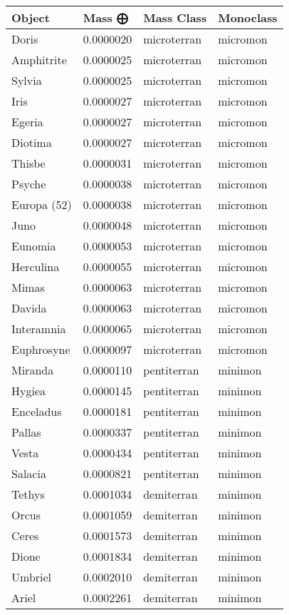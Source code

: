\documentclass[
  letterpaper,
]{book}
\begin{document}
\begin{longtable}[]{@{}llll@{}}
\toprule\noalign{}
Object & Mass ⨁ & Mass Class & Monoclass \\
\midrule\noalign{}
\endhead
\bottomrule\noalign{}
\endlastfoot
Doris & 0.0000020 & microterran & micromon \\
Amphitrite & 0.0000025 & microterran & micromon \\
Sylvia & 0.0000025 & microterran & micromon \\
Iris & 0.0000027 & microterran & micromon \\
Egeria & 0.0000027 & microterran & micromon \\
Diotima & 0.0000027 & microterran & micromon \\
Thisbe & 0.0000031 & microterran & micromon \\
Psyche & 0.0000038 & microterran & micromon \\
Europa (52) & 0.0000038 & microterran & micromon \\
Juno & 0.0000048 & microterran & micromon \\
Eunomia & 0.0000053 & microterran & micromon \\
Herculina & 0.0000055 & microterran & micromon \\
Mimas & 0.0000063 & microterran & micromon \\
Davida & 0.0000063 & microterran & micromon \\
Interamnia & 0.0000065 & microterran & micromon \\
Euphrosyne & 0.0000097 & microterran & micromon \\
Miranda & 0.0000110 & pentiterran & minimon \\
Hygiea & 0.0000145 & pentiterran & minimon \\
Enceladus & 0.0000181 & pentiterran & minimon \\
Pallas & 0.0000337 & pentiterran & minimon \\
Vesta & 0.0000434 & pentiterran & minimon \\
Salacia & 0.0000821 & pentiterran & minimon \\
Tethys & 0.0001034 & demiterran & minimon \\
Orcus & 0.0001059 & demiterran & minimon \\
Ceres & 0.0001573 & demiterran & minimon \\
Dione & 0.0001834 & demiterran & minimon \\
Umbriel & 0.0002010 & demiterran & minimon \\
Ariel & 0.0002261 & demiterran & minimon \\

\end{longtable}
\end{document}
